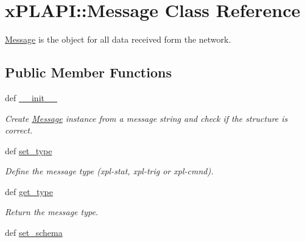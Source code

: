 \hypertarget{classxPLAPI_1_1Message}{
\section{xPLAPI::Message Class Reference}
\label{classxPLAPI_1_1Message}
}
\hyperlink{classxPLAPI_1_1Message}{Message} is the object for all data received form the network.  


\subsection*{Public Member Functions}
\begin{CompactItemize}
\item 
def \hyperlink{classxPLAPI_1_1Message_f1efb1186af373f1ce3d107be47e3f3f}{\_\-\_\-init\_\-\_\-}
\begin{CompactList}\small\item\em Create \hyperlink{classxPLAPI_1_1Message}{Message} instance from a message string and check if the structure is correct. \item\end{CompactList}\item 
\hypertarget{classxPLAPI_1_1Message_a24b962cfffbd90f1cb79a2c20e581e6}{
def \hyperlink{classxPLAPI_1_1Message_a24b962cfffbd90f1cb79a2c20e581e6}{set\_\-type}}
\label{classxPLAPI_1_1Message_a24b962cfffbd90f1cb79a2c20e581e6}

\begin{CompactList}\small\item\em Define the message type (xpl-stat, xpl-trig or xpl-cmnd). \item\end{CompactList}\item 
\hypertarget{classxPLAPI_1_1Message_55aad8c9b685e349f7e3d3f58b6ff5aa}{
def \hyperlink{classxPLAPI_1_1Message_55aad8c9b685e349f7e3d3f58b6ff5aa}{get\_\-type}}
\label{classxPLAPI_1_1Message_55aad8c9b685e349f7e3d3f58b6ff5aa}

\begin{CompactList}\small\item\em Return the message type. \item\end{CompactList}\item 
\hypertarget{classxPLAPI_1_1Message_560b2b7685ee99a34ea7d01e7135477c}{
def \hyperlink{classxPLAPI_1_1Message_560b2b7685ee99a34ea7d01e7135477c}{set\_\-schema}}
\label{classxPLAPI_1_1Message_560b2b7685ee99a34ea7d01e7135477c}


\end{CompactItemize}
